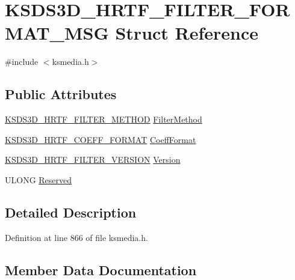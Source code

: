 \hypertarget{struct_k_s_d_s3_d___h_r_t_f___f_i_l_t_e_r___f_o_r_m_a_t___m_s_g}{}\section{K\+S\+D\+S3\+D\+\_\+\+H\+R\+T\+F\+\_\+\+F\+I\+L\+T\+E\+R\+\_\+\+F\+O\+R\+M\+A\+T\+\_\+\+M\+SG Struct Reference}
\label{struct_k_s_d_s3_d___h_r_t_f___f_i_l_t_e_r___f_o_r_m_a_t___m_s_g}


{\ttfamily \#include $<$ksmedia.\+h$>$}

\subsection*{Public Attributes}
\begin{DoxyCompactItemize}
\item 
\hyperlink{ksmedia_8h_a7efeaaf9f7a3030dd2877b4dbf389d64}{K\+S\+D\+S3\+D\+\_\+\+H\+R\+T\+F\+\_\+\+F\+I\+L\+T\+E\+R\+\_\+\+M\+E\+T\+H\+OD} \hyperlink{struct_k_s_d_s3_d___h_r_t_f___f_i_l_t_e_r___f_o_r_m_a_t___m_s_g_a37183dd392ddd762e4da356f90e40956}{Filter\+Method}
\item 
\hyperlink{ksmedia_8h_ac9df5cafde3728f28fb19ad5e9509560}{K\+S\+D\+S3\+D\+\_\+\+H\+R\+T\+F\+\_\+\+C\+O\+E\+F\+F\+\_\+\+F\+O\+R\+M\+AT} \hyperlink{struct_k_s_d_s3_d___h_r_t_f___f_i_l_t_e_r___f_o_r_m_a_t___m_s_g_a068c272ddbe117eb6564bc596117e873}{Coeff\+Format}
\item 
\hyperlink{ksmedia_8h_a2606cf5ac421bb3cc0b6a5c7063bdabd}{K\+S\+D\+S3\+D\+\_\+\+H\+R\+T\+F\+\_\+\+F\+I\+L\+T\+E\+R\+\_\+\+V\+E\+R\+S\+I\+ON} \hyperlink{struct_k_s_d_s3_d___h_r_t_f___f_i_l_t_e_r___f_o_r_m_a_t___m_s_g_ad73048f7bdad9798c9b68689f9924579}{Version}
\item 
U\+L\+O\+NG \hyperlink{struct_k_s_d_s3_d___h_r_t_f___f_i_l_t_e_r___f_o_r_m_a_t___m_s_g_ac6ff52157a2b03bc864d6de6f51469f5}{Reserved}
\end{DoxyCompactItemize}


\subsection{Detailed Description}


Definition at line 866 of file ksmedia.\+h.



\subsection{Member Data Documentation}
